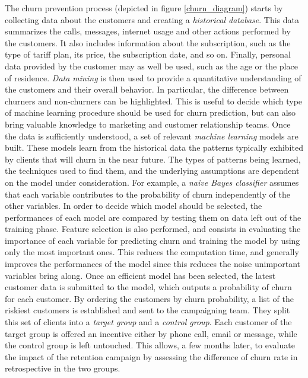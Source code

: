 The churn prevention process (depicted in figure \ref{churn_diagram}) starts by
collecting data about the customers and creating a \emph{historical database}.
This data summarizes the calls, messages, internet usage and other actions
performed by the customers. It also includes information about the subscription,
such as the type of tariff plan, its price, the subscription date, and so on.
Finally, personal data provided by the customer may as well be used, such as the
age or the place of residence. \emph{Data mining} is then used to provide a
quantitative understanding of the customers and their overall behavior. In
particular, the difference between churners and non-churners can be highlighted.
This is useful to decide which type of machine learning procedure should be used
for churn prediction, but can also bring valuable knowledge to marketing and
customer relationship teams. Once the data is sufficiently understood, a set of
relevant \emph{machine learning} models are built. These models learn from the
historical data the patterns typically exhibited by clients that will churn in
the near future. The types of patterns being learned, the techniques used to find
them, and the underlying assumptions are dependent on the model under
consideration. For example, a \emph{naive Bayes classifier} assumes that each
variable contributes to the probability of churn independently of the other
variables. In order to decide which model should be selected, the performances
of each model are compared by testing them on data left out of the training
phase. Feature selection is also performed, and consists in evaluating the
importance of each variable for predicting churn and training the model by
using only the most important ones. This reduces the computation time, and
generally improves the performances of the model since this reduces the noise
unimportant variables bring along. Once an efficient model has been selected,
the latest customer data is  submitted to the model, which outputs a probability
of churn for each customer. By ordering the customers by churn probability, a
list of the riskiest customers is established and sent to the campaigning team.
They split this set of clients into a \emph{target group} and a \emph{control
group}. Each customer of the target group is offered an incentive either by
phone call, email or message, while the control group is left untouched. This
allows, a few months later, to evaluate the impact of the retention campaign by
assessing the difference of churn rate in retrospective in the two groups.


